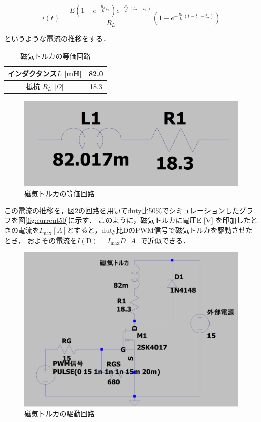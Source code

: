\begin{equation}
	i(t) = \frac{E\left(1-e^{-\frac{R_L}{L}t_1}\right)e^{-\frac{R_L}{L}(t_2-t_1)}}{R_L}\left(1-e^{-\frac{R_L}{L}(t-t_1-t_2)}\right)
\end{equation}

というような電流の推移をする．

\begin{table}[H]
	\centering
	\caption{磁気トルカの等価回路}
	\label{table:torquer2}
	\begin{tabular}{|c||c|}
		\hline
		インダクタンス$L$ [mH] & 	82.0 \\ \hline
		抵抗 $R_L$ [$\Omega $] & 18.3 \\ \hline 
	\end{tabular}
\end{table}

\begin{figure}[H]
	\centering
		\includegraphics[scale=0.3]{./figure/touka.png}
		\caption{磁気トルカの等価回路}
		\label{fig:touka}
\end{figure}

この電流の推移を，図\ref{fig:cirkit}の回路を用いてduty比50\%でシミュレーションしたグラフを図\ref{fig:current50}に示す．
このように，磁気トルカに電圧E [V] を印加したときの電流を$I_\mathrm{max} [A]$とすると，duty比DのPWM信号で磁気トルカを駆動させたとき，
およその電流を$I(\mathrm{D})=I_\mathrm{max}D [A]$で近似できる． 

\begin{figure}[H]
	\centering
		\includegraphics[scale=0.3]{./figure/駆動回路.png}
		\caption{磁気トルカの駆動回路}
		\label{fig:cirkit}
\end{figure}

